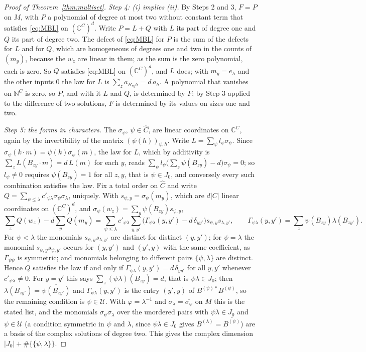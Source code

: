 \begin{proof}[Proof of Theorem~\ref{thm:multiset}]
\emph{Step 4: (i) implies (ii).} By Steps 2 and 3, $F=P$ on $M$, with $P$ a polynomial of degree at most two without constant term that satisfies \eqref{eq:MBL} on $(\mathbb{C}^C)^d$. Write $P=L+Q$ with $L$ its part of degree one and $Q$ its part of degree two. The defect of \eqref{eq:MBL} for $P$ is the sum of the defects for $L$ and for $Q$, which are homogeneous of degrees one and two in the counts of $(m_y)$, because the $w_z$ are linear in them; as the sum is the zero polynomial, each is zero. So $Q$ satisfies \eqref{eq:MBL} on $(\mathbb{C}^C)^d$, and $L$ does; with $m_y=e_h$ and the other inputs $0$ the law for $L$ is $\sum_za_{B_{zy}h}=d\,a_h$. A polynomial that vanishes on $\mathbb{N}^C$ is zero, so $P$, and with it $L$ and $Q$, is determined by $F$; by Step 3 applied to the difference of two solutions, $F$ is determined by its values on sizes one and two.

\emph{Step 5: the forms in characters.} The $\sigma_\psi$, $\psi\in\hat C$, are linear coordinates on $\mathbb{C}^C$, again by the invertibility of the matrix $(\psi(h))_{\psi,h}$. Write $L=\sum_\psi l_\psi\sigma_\psi$. Since $\sigma_\psi(k\cdot m)=\psi(k)\sigma_\psi(m)$, the law for $L$, which by additivity is $\sum_zL(B_{zy}\cdot m)=d\,L(m)$ for each $y$, reads $\sum_\psi l_\psi\bigl(\sum_z\psi(B_{zy})-d\bigr)\sigma_\psi=0$; so $l_\psi\ne0$ requires $\psi(B_{zy})=1$ for all $z,y$, that is $\psi\in J_0$, and conversely every such combination satisfies the law. Fix a total order on $\hat C$ and write $Q=\sum_{\psi\le\lambda}c'_{\psi\lambda}\sigma_\psi\sigma_\lambda$, uniquely. With $s_{\psi,y}=\sigma_\psi(m_y)$, which are $d|C|$ linear coordinates on $(\mathbb{C}^C)^d$, and $\sigma_\psi(w_z)=\sum_y\psi(B_{zy})s_{\psi,y}$,
\[
\sum_zQ(w_z)-d\sum_yQ(m_y)=\sum_{\psi\le\lambda}c'_{\psi\lambda}\sum_{y,y'}\bigl(\Gamma_{\psi\lambda}(y,y')-d\,\delta_{yy'}\bigr)s_{\psi,y}s_{\lambda,y'},\qquad
\Gamma_{\psi\lambda}(y,y')=\sum_z\psi(B_{zy})\lambda(B_{zy'}) .
\]
For $\psi<\lambda$ the monomials $s_{\psi,y}s_{\lambda,y'}$ are distinct for distinct $(y,y')$; for $\psi=\lambda$ the monomial $s_{\psi,y}s_{\psi,y'}$ occurs for $(y,y')$ and $(y',y)$ with the same coefficient, as $\Gamma_{\psi\psi}$ is symmetric; and monomials belonging to different pairs $\{\psi,\lambda\}$ are distinct. Hence $Q$ satisfies the law if and only if $\Gamma_{\psi\lambda}(y,y')=d\,\delta_{yy'}$ for all $y,y'$ whenever $c'_{\psi\lambda}\ne0$. For $y=y'$ this says $\sum_z(\psi\lambda)(B_{zy})=d$, that is $\psi\lambda\in J_0$; then $\lambda(B_{zy'})=\overline{\psi(B_{zy'})}$ and $\Gamma_{\psi\lambda}(y,y')$ is the entry $(y',y)$ of $B^{(\psi)*}B^{(\psi)}$, so the remaining condition is $\psi\in \mathcal{U}$. With $\varphi=\lambda^{-1}$ and $\sigma_\lambda=\overline{\sigma_\varphi}$ on $M$ this is the stated list, and the monomials $\sigma_\psi\sigma_\lambda$ over the unordered pairs with $\psi\lambda\in J_0$ and $\psi\in \mathcal{U}$ (a condition symmetric in $\psi$ and $\lambda$, since $\psi\lambda\in J_0$ gives $B^{(\lambda)}=\overline{B^{(\psi)}}$) are a basis of the complex solutions of degree two. This gives the complex dimension $|J_0|+\#\{\{\psi,\lambda\}\}$.


\end{proof}

